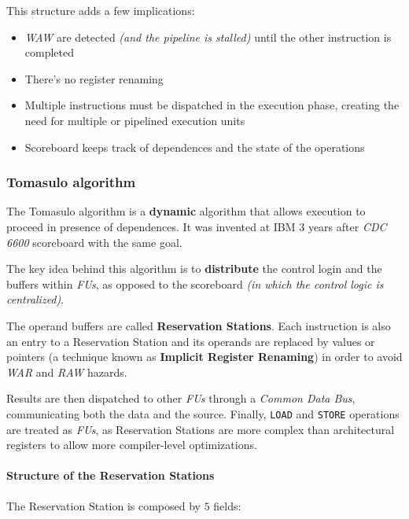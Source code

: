 \documentclass[english]{article}
\begin{document}
This structure adds a few implications:

\begin{itemize}
  \item \textit{WAW} are detected \textit{(and the pipeline is stalled)} until the other instruction is completed
  \item There's no register renaming
  \item Multiple instructions must be dispatched in the execution phase, creating the need for multiple or pipelined execution units
  \item Scoreboard keeps track of dependences and the state of the operations
\end{itemize}

\subsubsection{Tomasulo algorithm}

The Tomasulo algorithm is a \textbf{dynamic} algorithm that allows execution to proceed in presence of dependences.
It was invented at IBM \(3\) years after \textit{CDC 6600} scoreboard with the same goal.

The key idea behind this algorithm is to \textbf{distribute} the control login and the buffers within \textit{FUs}, as opposed to the scoreboard \textit{(in which the control logic is centralized)}.

The operand buffers are called \textbf{Reservation Stations}.
Each instruction is also an entry to a Reservation Station and its operands are replaced by values or pointers (a technique known as \textbf{Implicit Register Renaming}) in order to avoid \textit{WAR} and \textit{RAW} hazards.

Results are then dispatched to other \textit{FUs} through a \textit{Common Data Bus}, communicating both the data and the source.
Finally, \texttt{LOAD} and \texttt{STORE} operations are treated as \textit{FUs}, as Reservation Stations are more complex than architectural registers to allow more compiler-level optimizations.

\paragraph{Structure of the Reservation Stations}

The Reservation Station is composed by \(5\) fields:
\end{document}
